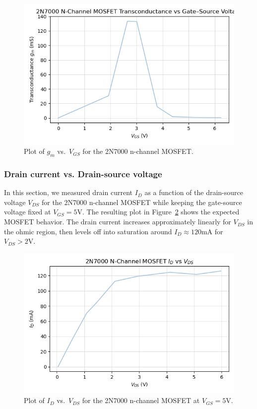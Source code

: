 \documentclass{article}
\begin{document}
\begin{figure}[H]
    \centering
    \includegraphics[width=0.8\linewidth]{6.2b.png}
    \caption{Plot of $g_m$ vs.\ $V_{GS}$ for the 2N7000 n-channel MOSFET.}
    \label{fig:mosfet_gm}
\end{figure}


\subsubsection{Drain current vs. Drain-source voltage}

In this section, we measured drain current $I_D$ as a function of the
drain-source voltage $V_{DS}$ for the 2N7000 n-channel MOSFET while keeping
the gate-source voltage fixed at $V_{GS}=5\si{\volt}$. The resulting plot
in Figure~\ref{fig:mosfet_id_vds} shows the expected MOSFET behavior. The
drain current increases approximately linearly for $V_{DS}$ in the ohmic
region, then levels off into saturation around $I_D\approx120\si{\milli\ampere}$
for $V_{DS} > 2\si{\volt}$.

\begin{figure}[H]
    \centering
    \includegraphics[width=0.8\linewidth]{6.2c.png}
    \caption{Plot of $I_D$ vs.\ $V_{DS}$ for the 2N7000 n-channel MOSFET at $V_{GS} = 5$V.}
    \label{fig:mosfet_id_vds}
\end{figure}
\end{document}
